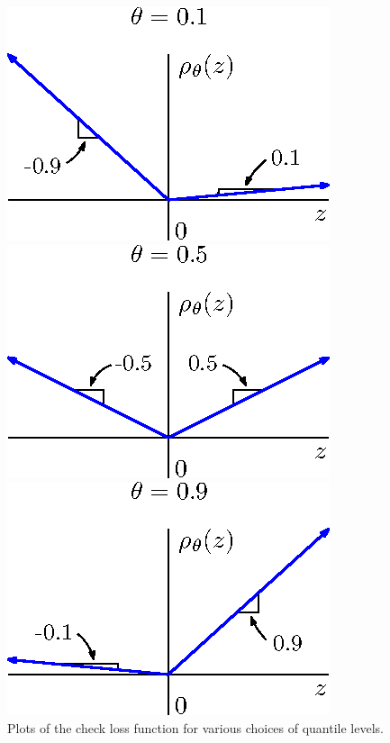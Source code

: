 \begin{figure}[ht]
  \caption[Quantile loss function]{Plots of the check loss function for various
    choices of quantile levels.}
  \label{fig:quantile-loss}
  \vspace{5mm}

  \begin{minipage}[t]{0.33\linewidth}
    \centering
    \includegraphics{check-loss-0-1}
  \end{minipage}
  \begin{minipage}[t]{0.33\linewidth}
    \centering
    \includegraphics{check-loss-0-5}
  \end{minipage}
  \begin{minipage}[t]{0.33\linewidth}
    \centering
    \includegraphics{check-loss-0-9}
  \end{minipage}
  
\end{figure}


